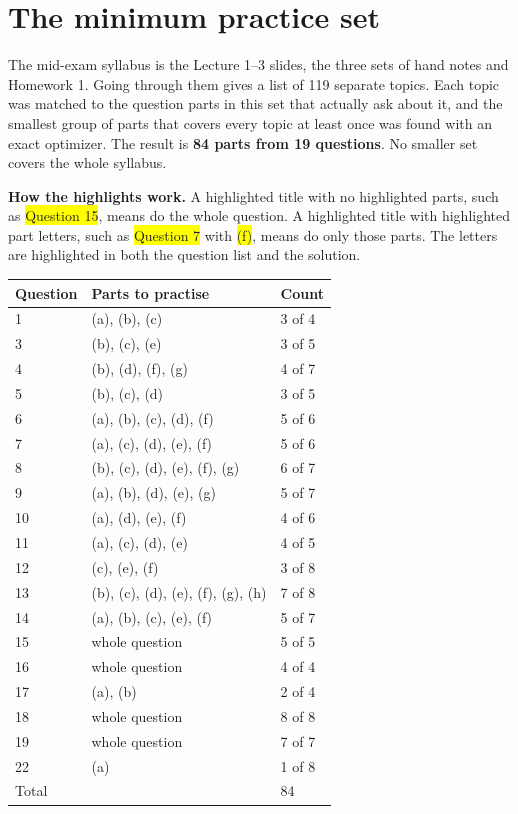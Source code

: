 \documentclass[12pt,a4paper]{article}
\begin{document}
\section{The minimum practice set}

The mid-exam syllabus is the Lecture 1--3 slides, the three sets of hand notes and Homework 1. Going through them gives a list of 119 separate topics. Each topic was matched to the question parts in this set that actually ask about it, and the smallest group of parts that covers every topic at least once was found with an exact optimizer. The result is \textbf{84 parts from 19 questions}. No smaller set covers the whole syllabus.

\textbf{How the highlights work.} A highlighted title with no highlighted parts, such as \colorbox{yellow}{Question 15}, means do the whole question. A highlighted title with highlighted part letters, such as \colorbox{yellow}{Question 7} with \colorbox{yellow}{(f)}, means do only those parts. The letters are highlighted in both the question list and the solution.

\begin{center}
\begin{tabular}{@{}l>{\raggedright\arraybackslash}p{}l@{}}
\toprule
Question & Parts to practise & Count \\
\midrule
1 & (a), (b), (c) & 3 of 4 \\
3 & (b), (c), (e) & 3 of 5 \\
4 & (b), (d), (f), (g) & 4 of 7 \\
5 & (b), (c), (d) & 3 of 5 \\
6 & (a), (b), (c), (d), (f) & 5 of 6 \\
7 & (a), (c), (d), (e), (f) & 5 of 6 \\
8 & (b), (c), (d), (e), (f), (g) & 6 of 7 \\
9 & (a), (b), (d), (e), (g) & 5 of 7 \\
10 & (a), (d), (e), (f) & 4 of 6 \\
11 & (a), (c), (d), (e) & 4 of 5 \\
12 & (c), (e), (f) & 3 of 8 \\
13 & (b), (c), (d), (e), (f), (g), (h) & 7 of 8 \\
14 & (a), (b), (c), (e), (f) & 5 of 7 \\
15 & whole question & 5 of 5 \\
16 & whole question & 4 of 4 \\
17 & (a), (b) & 2 of 4 \\
18 & whole question & 8 of 8 \\
19 & whole question & 7 of 7 \\
22 & (a) & 1 of 8 \\
\midrule
Total & & 84 \\
\bottomrule
\end{tabular}
\end{center}
\end{document}
